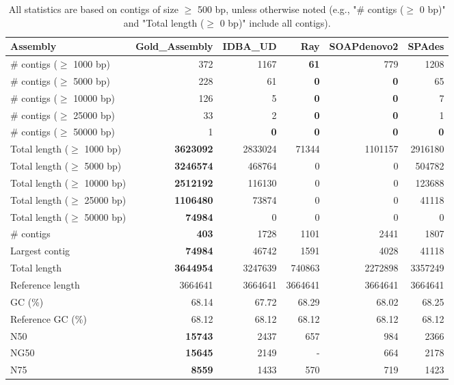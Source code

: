 \documentclass[12pt,a4paper]{article}
\begin{document}
\begin{table}[ht]
\begin{center}
\caption{All statistics are based on contigs of size $\geq$ 500 bp, unless otherwise noted (e.g., "\# contigs ($\geq$ 0 bp)" and "Total length ($\geq$ 0 bp)" include all contigs).}
\begin{tabular}{|l*{5}{|r}|}
\hline
Assembly & Gold\_Assembly & IDBA\_UD & Ray & SOAPdenovo2 & SPAdes \\ \hline
\# contigs ($\geq$ 1000 bp) & 372 & 1167 & {\bf 61} & 779 & 1208 \\ \hline
\# contigs ($\geq$ 5000 bp) & 228 & 61 & {\bf 0} & {\bf 0} & 65 \\ \hline
\# contigs ($\geq$ 10000 bp) & 126 & 5 & {\bf 0} & {\bf 0} & 7 \\ \hline
\# contigs ($\geq$ 25000 bp) & 33 & 2 & {\bf 0} & {\bf 0} & 1 \\ \hline
\# contigs ($\geq$ 50000 bp) & 1 & {\bf 0} & {\bf 0} & {\bf 0} & {\bf 0} \\ \hline
Total length ($\geq$ 1000 bp) & {\bf 3623092} & 2833024 & 71344 & 1101157 & 2916180 \\ \hline
Total length ($\geq$ 5000 bp) & {\bf 3246574} & 468764 & 0 & 0 & 504782 \\ \hline
Total length ($\geq$ 10000 bp) & {\bf 2512192} & 116130 & 0 & 0 & 123688 \\ \hline
Total length ($\geq$ 25000 bp) & {\bf 1106480} & 73874 & 0 & 0 & 41118 \\ \hline
Total length ($\geq$ 50000 bp) & {\bf 74984} & 0 & 0 & 0 & 0 \\ \hline
\# contigs & {\bf 403} & 1728 & 1101 & 2441 & 1807 \\ \hline
Largest contig & {\bf 74984} & 46742 & 1591 & 4028 & 41118 \\ \hline
Total length & {\bf 3644954} & 3247639 & 740863 & 2272898 & 3357249 \\ \hline
Reference length & 3664641 & 3664641 & 3664641 & 3664641 & 3664641 \\ \hline
GC (\%) & 68.14 & 67.72 & 68.29 & 68.02 & 68.25 \\ \hline
Reference GC (\%) & 68.12 & 68.12 & 68.12 & 68.12 & 68.12 \\ \hline
N50 & {\bf 15743} & 2437 & 657 & 984 & 2366 \\ \hline
NG50 & {\bf 15645} & 2149 & - & 664 & 2178 \\ \hline
N75 & {\bf 8559} & 1433 & 570 & 719 & 1423 \\ \hline

\end{tabular}
\end{center}
\end{table}
\end{document}
